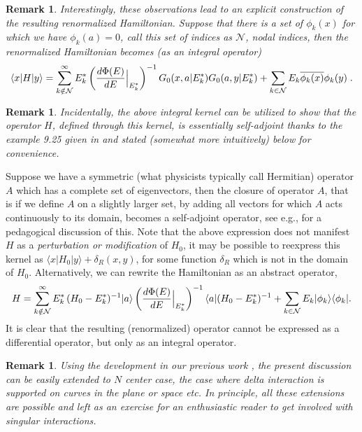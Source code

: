 \documentclass[amsmath,amssymb,14pt]{article}
\numberwithin{equation}{section}
\newtheorem{myremark}[mytheo]{Remark}
\begin{document}
\begin{myremark}
Interestingly, these observations lead to an explicit construction of the resulting renormalized Hamiltonian. Suppose that there is a set of $\phi_k(x)$ for which we have $\phi_k(a)=0$, call this set of indices as ${\mathcal N}$, nodal indices, then  the renormalized Hamiltonian becomes (as an integral operator)
\begin{equation}
\langle x|H| y\rangle=\sum_{ k\notin {\mathcal N}}^\infty E_k^* \left( {d\Phi(E)\over dE}\Big|_{E_k^*}\right)^{-1}G_0(x, a|E_k^*)G_0(a, y|E_k^*)
+\sum_{k \in \mathcal{N}}E_k\overline{ \phi_k(x)}\phi_k(y) \;. \end{equation}    
\end{myremark}
%
\begin{myremark}
Incidentally, the above integral kernel can be utilized to show that the operator $H$, defined through this kernel,  is {\it essentially self-adjoint}  thanks to the example 9.25  given in \cite{Hall} and stated (somewhat more intuitively) below for convenience.  
\end{myremark}
Suppose we have a symmetric (what physicists typically call Hermitian) operator $A$ which has a complete set of eigenvectors, then the closure of operator $A$, that is if we define $A$ on a slightly larger set, by adding all vectors for which 
$A$ acts continuously to its domain, becomes a self-adjoint operator, see e.g., \cite{Michelangeli} for a pedagogical discussion of this.
Note that the above expression does not manifest $H$ as a {\it perturbation or modification} of $H_0$, it may be possible to reexpress this kernel as $\langle x|H_0|y\rangle+\delta_R(x,y)$, for some function $\delta_R$ which is not in the domain of $H_0$.
Alternatively, we can rewrite the Hamiltonian as an abstract operator,
\begin{equation}
H=\sum_{ k\notin {\mathcal N}}^\infty E_k^*\, (H_0-E_k^*)^{-1}| a\rangle \left( {d\Phi(E)\over dE}\Big|_{E_k^*}\right)^{-1}\langle a| (H_0-E_k^*)^{-1}+
    \sum_{k \in \mathcal{N}}E_k|\phi_k\rangle\langle \phi_k|
.\end{equation}
It is clear that the resulting (renormalized) operator cannot be expressed as a differential operator, but only as an integral operator.



\begin{myremark}
    Using the development in our previous work \cite{Annals23}, the present discussion can be easily extended to $N$ center case, the case where delta interaction is supported on curves in the plane or space etc. In principle, all these extensions are possible and left as an exercise for an enthusiastic reader to get involved with singular interactions.    
\end{myremark}
\end{document}
